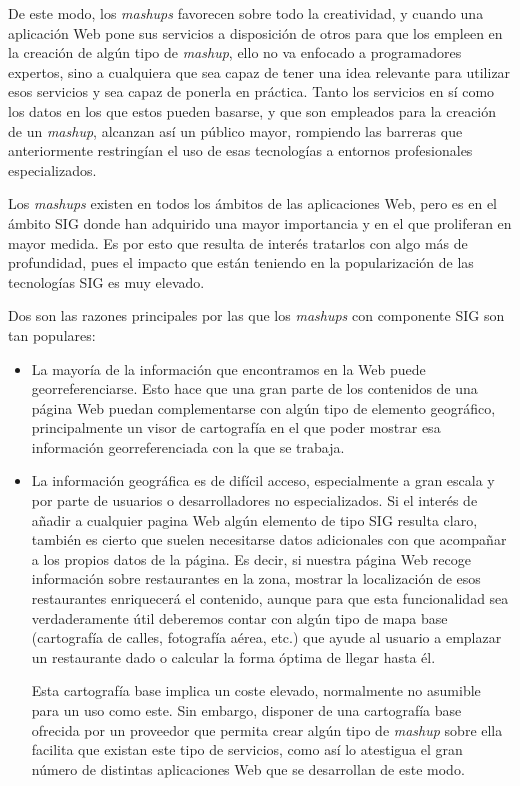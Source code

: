 De este modo, los \emph{mashups} favorecen sobre todo la creatividad, y cuando una aplicación Web pone sus servicios a disposición de otros para que los empleen en la creación de algún tipo de \emph{mashup}, ello no va enfocado a programadores expertos, sino a cualquiera que sea capaz de tener una idea relevante para utilizar esos servicios y sea capaz de ponerla en práctica. Tanto los servicios en sí como los datos en los que estos pueden basarse, y que son empleados para la creación de un \emph{mashup}, alcanzan así un público mayor, rompiendo las barreras que anteriormente restringían el uso de esas tecnologías a entornos profesionales especializados.

Los \emph{mashups} existen en todos los ámbitos de las aplicaciones Web, pero es en el ámbito SIG donde han adquirido una mayor importancia y en el que proliferan en mayor medida. Es por esto que resulta de interés tratarlos con algo más de profundidad, pues el impacto que están teniendo en la popularización de las tecnologías SIG es muy elevado.

Dos son las razones principales por las que los \emph{mashups} con componente SIG son tan populares:

\begin{itemize}
 \item La mayoría de la información que encontramos en la Web puede georreferenciarse. Esto hace que una gran parte de los contenidos de una página Web puedan complementarse con algún tipo de elemento geográfico, principalmente un visor de cartografía en el que poder mostrar esa información georreferenciada con la que se trabaja.
\item La información geográfica es de difícil acceso, especialmente a gran escala y por parte de usuarios o desarrolladores no especializados. Si el interés de añadir a cualquier pagina Web algún elemento de tipo SIG resulta claro, también es cierto que suelen necesitarse datos adicionales con que acompañar a los propios datos de la página. Es decir, si nuestra página Web recoge información sobre restaurantes en la zona, mostrar la localización de esos restaurantes enriquecerá el contenido, aunque para que esta funcionalidad sea verdaderamente útil deberemos contar con algún tipo de mapa base (cartografía de calles, fotografía aérea, etc.) que ayude al usuario a emplazar un restaurante dado o calcular la forma óptima de llegar hasta él.

Esta cartografía base implica un coste elevado, normalmente no asumible para un uso como este. Sin embargo, disponer de una cartografía base ofrecida por un proveedor que permita crear algún tipo de \emph{mashup} sobre ella facilita que existan este tipo de servicios, como así lo atestigua el gran número de distintas aplicaciones Web que se desarrollan de este modo.
\end{itemize}

